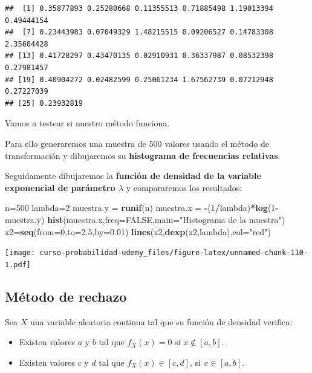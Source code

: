 \documentclass[]{book}
\newenvironment{Shaded}{\begin{snugshade}}{\end{snugshade}}
\newcommand{\DataTypeTok}[1]{\textcolor[rgb]{0.13,0.29,0.53}{#1}}
\newcommand{\DecValTok}[1]{\textcolor[rgb]{0.00,0.00,0.81}{#1}}
\newcommand{\FloatTok}[1]{\textcolor[rgb]{0.00,0.00,0.81}{#1}}
\newcommand{\KeywordTok}[1]{\textcolor[rgb]{0.13,0.29,0.53}{\textbf{#1}}}
\newcommand{\NormalTok}[1]{#1}
\newcommand{\OperatorTok}[1]{\textcolor[rgb]{0.81,0.36,0.00}{\textbf{#1}}}
\newcommand{\OtherTok}[1]{\textcolor[rgb]{0.56,0.35,0.01}{#1}}
\newcommand{\StringTok}[1]{\textcolor[rgb]{0.31,0.60,0.02}{#1}}
\providecommand{\tightlist}{%
  \setlength{\itemsep}{0pt}\setlength{\parskip}{0pt}}
\begin{document}
\begin{verbatim}
##  [1] 0.35877893 0.25280668 0.11355513 0.71885498 1.19013394 0.49444154
##  [7] 0.23443983 0.07049329 1.48215515 0.09206527 0.14783308 2.35604428
## [13] 0.41728297 0.43470135 0.02910931 0.36337987 0.08532398 0.27981457
## [19] 0.40904272 0.02482599 0.25061234 1.67562739 0.07212948 0.27227039
## [25] 0.23932819
\end{verbatim}

Vamos a testear si nuestro método funciona.

Para ello generaremos una muestra de 500 valores usando el método de transformación y dibujaremos su \textbf{histograma de frecuencias relativas}.

Seguidamente dibujaremos la \textbf{función de densidad de la variable exponencial de parámetro \(\lambda\)} y compararemos los resultados:

\begin{Shaded}
\begin{Highlighting}[]
\NormalTok{n=}\DecValTok{500}
\NormalTok{lambda=}\DecValTok{2}
\NormalTok{muestra.y =}\StringTok{ }\KeywordTok{runif}\NormalTok{(n)}
\NormalTok{muestra.x =}\StringTok{ }\OperatorTok{-}\NormalTok{(}\DecValTok{1}\OperatorTok{/}\NormalTok{lambda)}\OperatorTok{*}\KeywordTok{log}\NormalTok{(}\DecValTok{1}\OperatorTok{-}\NormalTok{muestra.y)}
\KeywordTok{hist}\NormalTok{(muestra.x,}\DataTypeTok{freq=}\OtherTok{FALSE}\NormalTok{,}\DataTypeTok{main=}\StringTok{"Histograma de la muestra"}\NormalTok{)}
\NormalTok{x2=}\KeywordTok{seq}\NormalTok{(}\DataTypeTok{from=}\DecValTok{0}\NormalTok{,}\DataTypeTok{to=}\FloatTok{2.5}\NormalTok{,}\DataTypeTok{by=}\FloatTok{0.01}\NormalTok{)}
\KeywordTok{lines}\NormalTok{(x2,}\KeywordTok{dexp}\NormalTok{(x2,lambda),}\DataTypeTok{col=}\StringTok{"red"}\NormalTok{)}
\end{Highlighting}
\end{Shaded}

\texttt{[image: curso-probabilidad-udemy\_files/figure-latex/unnamed-chunk-110-1.pdf]}

\hypertarget{muxe9todo-de-rechazo}{%
\subsection{Método de rechazo}\label{muxe9todo-de-rechazo}}

Sea \(X\) una variable aleatoria continua tal que su función de densidad verifica:

\begin{itemize}
\tightlist
\item
  Existen valores \(a\) y \(b\) tal que \(f_X(x)= 0\) si \(x\not\in [a,b]\).
\item
  Existen valores \(c\) y \(d\) tal que \(f_X(x)\in [c,d]\), si \(x\in [a,b]\).
\end{itemize}
\end{document}

